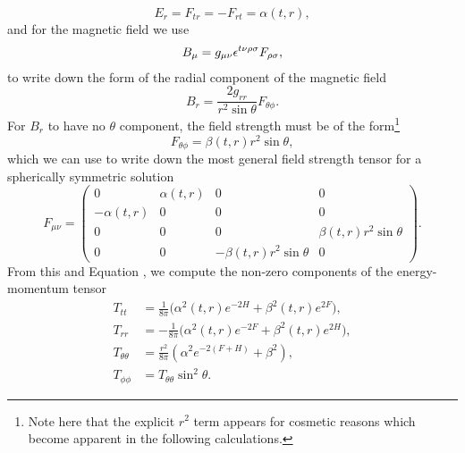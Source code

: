 \begin{equation*}
   E_r = F_{tr} = -F_{rt} = \alpha(t,r),
\end{equation*}
and for the magnetic field we use
\begin{equation*}
\begin{aligned}
     B_\mu = g_{\mu \nu} {\epsilon}^{t \nu \rho \sigma} F_{\rho \sigma},
\end{aligned}
\end{equation*}
to write down the form of the radial component of the magnetic field
\begin{equation*}
   B_r = \frac{2g_{rr}}{r^2 \sin \theta} F_{\theta \phi}.
\end{equation*}
For $B_r$ to have no $\theta$ component, the field strength must be of the form\footnote{Note here that the explicit $r^2$ term appears for cosmetic reasons which become apparent in the following calculations.}
\begin{equation*}
    F_{\theta \phi} = \beta(t,r) r^2 \sin \theta,
\end{equation*}
which we can use to write down the most general field strength tensor for a spherically symmetric solution
\begin{equation*}
   F_{\mu \nu} = \begin{pmatrix} 0 & \alpha(t,r) & 0 & 0 \\ -\alpha(t,r) & 0 & 0 & 0 \\ 0 & 0 & 0 & \beta(t,r) r^2 \sin \theta \\ 0 & 0 & -\beta(t,r) r^2 \sin \theta & 0 \end{pmatrix}.
\end{equation*}
From this and Equation , we compute the non-zero components of the energy-momentum tensor
\begin{equation}
\label{eq:rnemt}
   \begin{aligned}
     T_{tt} &= \frac{1}{8 \pi} \bigg(\alpha^2(t,r) e^{-2H} + \beta^2(t,r) e^{2F} \bigg),\\
     T_{rr} &= -\frac{1}{8 \pi}\bigg(\alpha^2(t,r) e^{-2F} + \beta^2(t,r) e^{2H} \bigg), \\
     T_{\theta \theta} &= \frac{r^2}{8 \pi} (\alpha^2 e^{-2(F+H)} + \beta^2),\\
     T_{\phi \phi} &=   T_{\theta \theta}\sin^2\theta.
   \end{aligned}
\end{equation}

